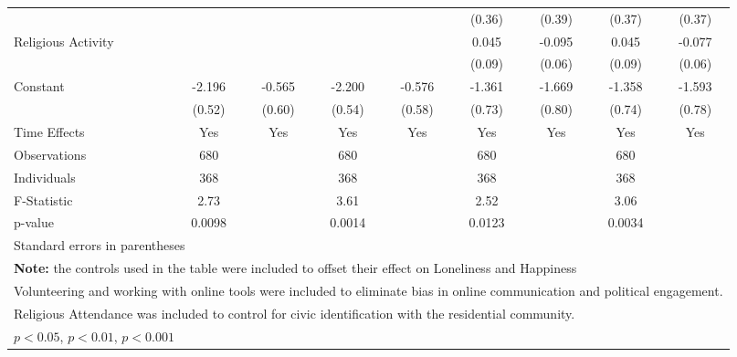 \begin{table}[htbp]
\begin{tabular}{l*{8}{c}}
                              &              &              &              &              &(0.36)         &(0.39)         &(0.37)         &(0.37)         \\
\hspace{0.25cm} Religious Activity&              &              &              &              &0.045         &-0.095         &0.045         &-0.077         \\
                              &              &              &              &              &(0.09)         &(0.06)         &(0.09)         &(0.06)         \\
Constant                      &-2.196\sym{***}&-0.565         &-2.200\sym{***}&-0.576         &-1.361         &-1.669\sym{*}  &-1.358         &-1.593\sym{*}  \\
                              &(0.52)         &(0.60)         &(0.54)         &(0.58)         &(0.73)         &(0.80)         &(0.74)         &(0.78)         \\
Time Effects                  &  Yes         &  Yes         &  Yes         &  Yes         &  Yes         &  Yes         &  Yes         &  Yes         \\
\midrule
Observations                  &  680         &              &  680         &              &  680         &              &  680         &              \\
Individuals                   &  368         &              &  368         &              &  368         &              &  368         &              \\
F-Statistic                   & 2.73         &              & 3.61         &              & 2.52         &              & 3.06         &              \\
p-value                       &0.0098         &              &0.0014         &              &0.0123         &              &0.0034         &              \\
\bottomrule
\multicolumn{9}{l}{\footnotesize Standard errors in parentheses}\\
\multicolumn{9}{l}{\footnotesize \textbf{Note:} the controls used in the table were included to offset their effect on Loneliness and Happiness}\\
\multicolumn{9}{l}{\footnotesize Volunteering and working with online tools were included to eliminate bias in online communication and political engagement.}\\
\multicolumn{9}{l}{\footnotesize Religious Attendance was included to control for civic identification with the residential community.}\\
\multicolumn{9}{l}{\footnotesize \sym{*} \(p<0.05\), \sym{**} \(p<0.01\), \sym{***} \(p<0.001\)}\\
\end{tabular}
\end{table}

